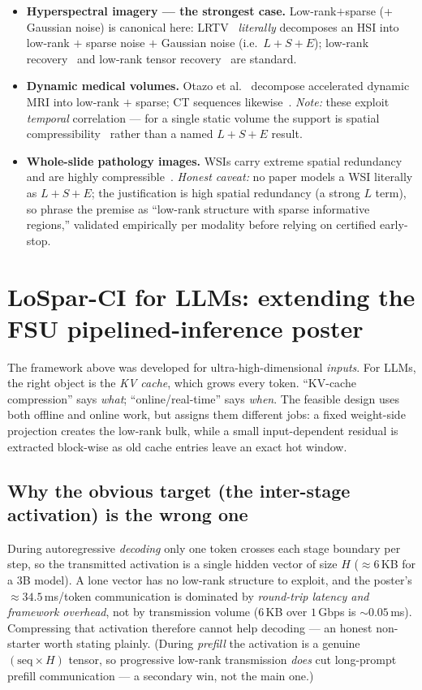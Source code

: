 \documentclass[11pt]{article}
\newcommand{\term}[1]{\textbf{\color{accent!85!black}#1}}
\begin{document}
\begin{itemize}[leftmargin=1.5em,itemsep=2pt]
\item \term{Hyperspectral imagery --- the strongest case.} Low-rank$+$sparse (+ Gaussian
noise) is canonical here: LRTV~\cite{lrtv} \emph{literally} decomposes an HSI into low-rank
$+$ sparse noise $+$ Gaussian noise (i.e.\ $L+S+E$); low-rank recovery~\cite{hsi_lowrank} and
low-rank tensor recovery~\cite{hsi_tensor} are standard.
\item \term{Dynamic medical volumes.} Otazo et al.~\cite{otazo} decompose accelerated dynamic
MRI into low-rank $+$ sparse; CT sequences likewise~\cite{ct_ls}. \emph{Note:} these exploit
\emph{temporal} correlation --- for a single static volume the support is spatial
compressibility~\cite{sparsemri} rather than a named $L+S+E$ result.
\item \term{Whole-slide pathology images.} WSIs carry extreme spatial redundancy and are
highly compressible~\cite{wsi_natcomm}. \emph{Honest caveat:} no paper models a WSI literally
as $L+S+E$; the justification is high spatial redundancy (a strong $L$ term), so phrase the
premise as ``low-rank structure with sparse informative regions,'' validated empirically per
modality before relying on certified early-stop.
\end{itemize}

\section{LoSpar-CI for LLMs: extending the FSU pipelined-inference poster}
\label{sec:llm}

The framework above was developed for ultra-high-dimensional \emph{inputs}. For LLMs, the
right object is the \emph{KV cache}, which grows every token. ``KV-cache compression'' says
\emph{what}; ``online/real-time'' says \emph{when}. The feasible design uses both offline
and online work, but assigns them different jobs: a fixed weight-side projection creates the
low-rank bulk, while a small input-dependent residual is extracted block-wise as old cache
entries leave an exact hot window.

\subsection{Why the obvious target (the inter-stage activation) is the wrong one}
During autoregressive \emph{decoding} only one token crosses each stage boundary per step,
so the transmitted activation is a single hidden vector of size $H$ ($\approx 6$\,KB for a
3B model). A lone vector has no low-rank structure to exploit, and the poster's
$\approx 34.5$\,ms/token communication is dominated by \emph{round-trip latency and framework
overhead}, not by transmission volume ($6$\,KB over $1$\,Gbps is $\sim0.05$\,ms). Compressing
that activation therefore cannot help decoding --- an honest non-starter worth stating
plainly. (During \emph{prefill} the activation is a genuine $(\text{seq}\times H)$ tensor, so
progressive low-rank transmission \emph{does} cut long-prompt prefill communication --- a
secondary win, not the main one.)
\end{document}
